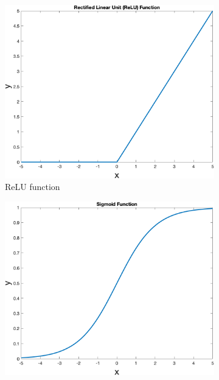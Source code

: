 \documentclass[12pt]{article}
\begin{document}
    \begin{figure}
        \centering
        \begin{subfigure}[b]{0.4\textwidth}
            \includegraphics[width=\textwidth]{figures/relu}
            \caption{ReLU function}
            \label{fig:relu}
        \end{subfigure}
        \hspace{0.1\textwidth}
        \begin{subfigure}[b]{0.4\textwidth}
            \includegraphics[width=\textwidth]{figures/sigmoid}

\end{subfigure}
\end{figure}
\end{document}
